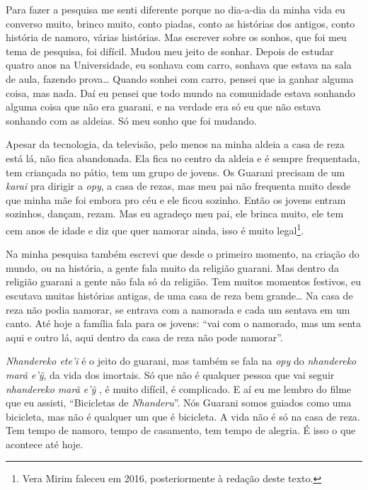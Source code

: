 Para fazer a pesquisa me senti diferente porque no dia-a-dia da minha
vida eu converso muito, brinco muito, conto piadas, conto as histórias
dos antigos, conto história de namoro, várias histórias. Mas escrever
sobre os sonhos, que foi meu tema de pesquisa, foi difícil. Mudou meu
jeito de sonhar. Depois de estudar quatro anos na Universidade, eu
sonhava com carro, sonhava que estava na sala de aula, fazendo prova\ldots{}
Quando sonhei com carro, pensei que ia ganhar alguma coisa, mas nada.
Daí eu pensei que todo mundo na comunidade estava sonhando alguma coisa
que não era guarani, e na verdade era só eu que não estava sonhando com
as aldeias. Só meu sonho que foi mudando.

Apesar da tecnologia, da televisão, pelo menos na minha aldeia a casa de
reza está lá, não fica abandonada. Ela fica no centro da aldeia e é
sempre frequentada, tem criançada no pátio, tem um grupo de jovens. Os
Guarani precisam de um \emph{karai} pra dirigir a \emph{opy}, a casa de rezas, mas
meu pai não frequenta muito desde que minha mãe foi embora pro céu e
ele ficou sozinho. Então os jovens entram sozinhos, dançam, rezam. Mas
eu agradeço meu pai, ele brinca muito, ele tem cem anos de idade e diz
que quer namorar ainda, isso é muito legal\footnote{Vera Mirim faleceu
em 2016, posteriormente à redação deste texto.}.

Na minha pesquisa também escrevi que desde o primeiro momento, na
criação do mundo, ou na história, a gente fala muito da religião
guarani. Mas dentro da religião guarani a gente não fala só da
religião. Tem muitos momentos festivos, eu escutava muitas histórias
antigas, de uma casa de reza bem grande\ldots{} Na casa de reza não podia
namorar, se entrava com a namorada e cada um sentava em um canto. Até
hoje a família fala para os jovens: ``vai com o namorado, mas um senta
aqui e outro lá, aqui dentro da casa de reza não pode namorar''.

\emph{Nhandereko ete’i} é o jeito do guarani, mas também se fala na \emph{opy} do
\emph{nhandereko marã e’ỹ}, da vida dos imortais. Só que não é qualquer
pessoa que vai seguir \emph{nhandereko marã e’ỹ} , é muito difícil, é
complicado. E aí eu me lembro do filme que eu assisti, ``Bicicletas de
\emph{Nhanderu}''. Nós Guarani somos guiados como uma bicicleta, mas não é
qualquer um que é bicicleta. A vida não é só na casa de reza. Tem tempo
de namoro, tempo de casamento, tem tempo de alegria. É isso o que
acontece até hoje.

